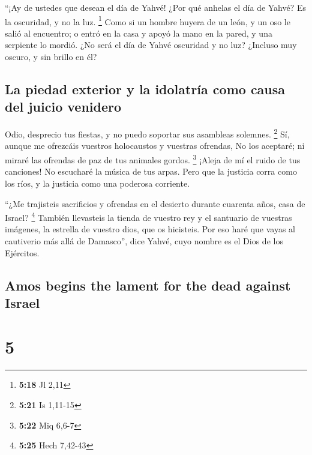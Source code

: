 \begin{paracol}{2}
 ``¡Ay de ustedes que desean el día de Yahvé! ¿Por qué
anhelas el día de Yahvé? Es la oscuridad, y no la luz. \footnote{\textbf{5:18}
  Jl 2,11}  Como si un hombre huyera de un león, y un oso
le salió al encuentro; o entró en la casa y apoyó la mano en la pared, y
una serpiente lo mordió.  ¿No será el día de Yahvé
oscuridad y no luz? ¿Incluso muy oscuro, y sin brillo en él?

\hypertarget{la-piedad-exterior-y-la-idolatruxeda-como-causa-del-juicio-venidero}{%
\subsection{La piedad exterior y la idolatría como causa del juicio
venidero}\label{la-piedad-exterior-y-la-idolatruxeda-como-causa-del-juicio-venidero}}

 Odio, desprecio tus fiestas, y no puedo soportar sus
asambleas solemnes. \footnote{\textbf{5:21} Is 1,11-15} 
Sí, aunque me ofrezcáis vuestros holocaustos y vuestras ofrendas, No los
aceptaré; ni miraré las ofrendas de paz de tus animales gordos.
\footnote{\textbf{5:22} Miq 6,6-7}  ¡Aleja de mí el ruido
de tus canciones! No escucharé la música de tus arpas. 
Pero que la justicia corra como los ríos, y la justicia como una
poderosa corriente.

 ``¿Me trajisteis sacrificios y ofrendas en el desierto
durante cuarenta años, casa de Israel? \footnote{\textbf{5:25} Hech
  7,42-43}  También llevasteis la tienda de vuestro rey y
el santuario de vuestras imágenes, la estrella de vuestro dios, que os
hicisteis.  Por eso haré que vayas al cautiverio más allá
de Damasco'', dice Yahvé, cuyo nombre es el Dios de los Ejércitos.

\switchcolumn
\begin{otherlanguage}{english}

\hypertarget{amos-begins-the-lament-for-the-dead-against-israel}{%
\subsection{Amos begins the lament for the dead against
Israel}\label{amos-begins-the-lament-for-the-dead-against-israel}}

\hypertarget{section-9}{%
\section{5}\label{section-9}}


\end{otherlanguage}
\end{paracol}
